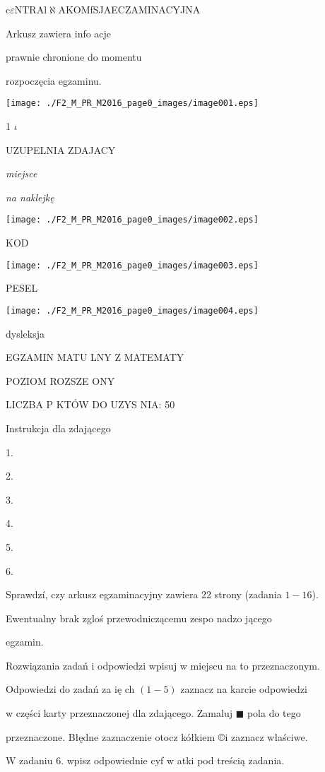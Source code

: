 \documentclass[a4paper,12pt]{article}
\begin{document}
$\mathrm{c}\varepsilon \mathrm{N}\mathrm{T}\mathrm{R}\mathrm{A}\mathrm{l}\aleph$AKOMfSJAECZAMINACYJNA

Arkusz zawiera info acje

prawnie chronione do momentu

rozpoczęcia egzaminu.
\begin{center}
\texttt{[image: ./F2\_M\_PR\_M2016\_page0\_images/image001.eps]}
\end{center}
1  $\iota$

UZUPELNIA ZDAJACY

{\it miejsce}

{\it na naklejkę}
\begin{center}
\texttt{[image: ./F2\_M\_PR\_M2016\_page0\_images/image002.eps]}
\end{center}
KOD
\begin{center}
\texttt{[image: ./F2\_M\_PR\_M2016\_page0\_images/image003.eps]}
\end{center}
PESEL
\begin{center}
\texttt{[image: ./F2\_M\_PR\_M2016\_page0\_images/image004.eps]}
\end{center}
dysleksja

EGZAMIN MATU  LNY Z MATEMATY

POZIOM ROZSZE  ONY

LICZBA P  KTÓW DO UZYS NIA: 50

Instrukcja dla zdającego

1.

2.

3.

4.

5.

6.

Sprawdzí, czy arkusz egzaminacyjny zawiera 22 strony (zadania $1-16$).

Ewentualny brak zgloś przewodniczącemu zespo nadzo jącego

egzamin.

Rozwiązania zadań i odpowiedzi wpisuj w miejscu na to przeznaczonym.

Odpowiedzi do zadań za ię ch $(1-5)$ zaznacz na karcie odpowiedzi

w części karty przeznaczonej dla zdającego. Zamaluj $\blacksquare$ pola do tego

przeznaczone. Błędne zaznaczenie otocz kółkiem \copyright i zaznacz właściwe.

$\mathrm{W}$ zadaniu 6. wpisz odpowiednie cyf w atki pod treścią zadania.
\end{document}
